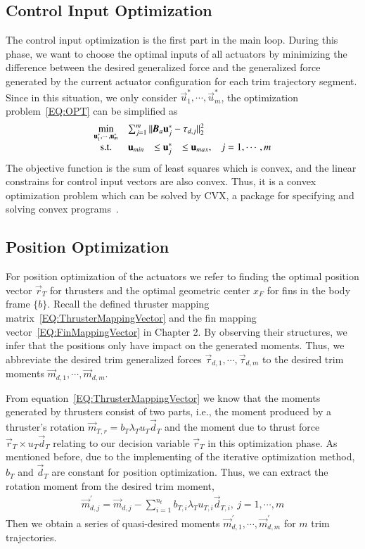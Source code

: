 \subsection{Control Input Optimization}
The control input optimization is the first part in the main loop. During this phase, we want to choose the optimal inputs of all actuators by minimizing the difference between the desired generalized force and the generalized force generated by the current actuator configuration for each trim trajectory segment. Since in this situation, we only consider $\vec{u}_{1}^{*}, \cdots, \vec{u}_{m}^{*}$, the optimization problem~\ref{EQ:OPT} can be simplified as
\begin{equation}
\begin{array}{ccclcl}
\displaystyle \min_{\vec{u}^{*}_{1}, \cdots, \vec{u}^{*}_{m}} & \multicolumn{3}{l}{\sum_{j=1}^{m}||\emph{\textbf{B}}_{a}\vec{u}^{*}_{j}-\vec{\tau}_{d,j}||^{2}_{2}} \\
\textrm{s.t.}
& \vec{u}_{min}&\leq \vec{u}_{j}^{*} & \leq \vec{u}_{max}, &j=1, \cdots, m
\end{array} \label{EQ:OPTInput}
\end{equation}
The objective function is the sum of least squares which is convex, and the linear constrains for control input vectors are also convex. Thus, it is a convex optimization problem which can be solved by CVX, a package for specifying and solving convex programs~\cite{cvx,gb08}. 
 
\subsection{Position Optimization}
For position optimization of the actuators we refer to finding the optimal position vector $\vec{r}_{T}$ for thrusters and the optimal geometric center $x_{F}$ for fins in the body frame $\lbrace b \rbrace$. 
Recall the defined thruster mapping matrix~\ref{EQ:ThrusterMappingVector} and the fin mapping vector~\ref{EQ:FinMappingVector} in Chapter 2. By observing their structures, we infer that the positions only have impact on the generated moments. Thus, we abbreviate the desired trim generalized forces $\vec{\tau}_{d,1}, \cdots, \vec{\tau}_{d,m}$ to the desired trim moments $\vec{m}_{d,1}, \cdots, \vec{m}_{d,m}$.

From equation~\ref{EQ:ThrusterMappingVector} we know that the moments generated by thrusters consist of two parts, i.e., the moment produced by a thruster's rotation $\vec{m}_{T,r}=b_{T}\lambda_{T} u_{T}\vec{d}_{T}$ and the moment due to thrust force $\vec{r}_{T}\times u_{T}\vec{d}_{T}$ relating to our decision variable $\vec{r}_{T}$ in this optimization phase. As mentioned before, due to the implementing of the iterative optimization method, $b_{T}$ and $\vec{d}_{T}$ are constant for position optimization. Thus, we can extract the rotation moment from the desired trim moment,
\begin{align}
\vec{m}_{d,j}^{'}=\vec{m}_{d,j}-\sum_{i=1}^{n_{t}}b_{T,i}\lambda_{T} u_{T,i}\vec{d}_{T,i}, ~j=1, \cdots, m
\end{align}
Then we obtain a series of quasi-desired moments $\vec{m}_{d,1}^{'},\cdots, \vec{m}_{d,m}^{'}$ for $m$ trim trajectories.

